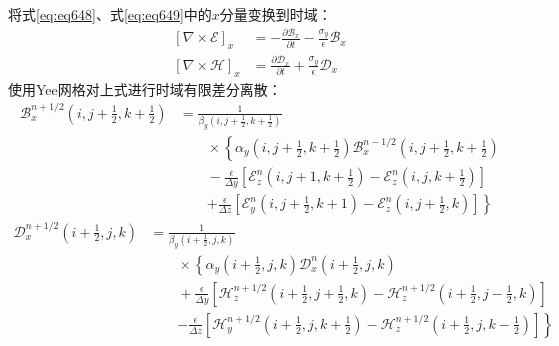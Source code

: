 \documentclass{article}
\numberwithin{equation}{section}
\renewcommand{\vec}[1]{\boldsymbol{#1}}
\begin{document}
将式\ref{eq:eq648}、式\ref{eq:eq649}中的$x$分量变换到时域：
\begin{align}
    \label{eq:eq652}
    \left[\nabla\times\vec{\mathcal{E}}\right]_x&=-\frac{\partial \mathcal{B}_x}{\partial t}-\frac{\sigma_y}{\epsilon}\mathcal{B}_x \\
    \label{eq:eq653}
    \left[\nabla\times\vec{\mathcal{H}}\right]_x&=\frac{\partial \mathcal{D}_x}{\partial t}+\frac{\sigma_y}{\epsilon}\mathcal{D}_x
\end{align}
使用Yee网格对上式进行时域有限差分离散：
\begin{align}
    \label{eq:eq654}
    \mathcal{B}^{n+1/2}_x\left(i,j+\frac{1}{2},k+\frac{1}{2}\right)&=\frac{1}{\beta_y\left(i,j+\frac{1}{2},k+\frac{1}{2}\right)} \nonumber \\
                                                                   &\qquad\times\left\{\alpha_y\left(i,j+\frac{1}{2},k+\frac{1}{2}\right)\mathcal{B}^{n-1/2}_x\left(i,j+\frac{1}{2},k+\frac{1}{2}\right)\right. \nonumber \\
                                                                   &\qquad-\frac{\epsilon}{\Delta y}\left[\mathcal{E}^n_z\left(i,j+1,k+\frac{1}{2}\right)-\mathcal{E}^n_z\left(i,j,k+\frac{1}{2}\right)\right] \nonumber \\
                                                                   &\qquad\left.+\frac{\epsilon}{\Delta z}\left[\mathcal{E}^n_y\left(i,j+\frac{1}{2},k+1\right)-\mathcal{E}^n_z\left(i,j+\frac{1}{2},k\right)\right]\right\}
\end{align}
\begin{align}
    \label{eq:eq655}
    \mathcal{D}^{n+1/2}_x\left(i+\frac{1}{2},j,k\right)&=\frac{1}{\beta_y\left(i+\frac{1}{2},j,k\right)} \nonumber \\
                                                       &\qquad\times\left\{\alpha_y\left(i+\frac{1}{2},j,k\right)\mathcal{D}^{n}_x\left(i+\frac{1}{2},j,k\right)\right. \nonumber \\
                                                       &\qquad+\frac{\epsilon}{\Delta y}\left[\mathcal{H}^{n+1/2}_z\left(i+\frac{1}{2},j+\frac{1}{2},k\right)-\mathcal{H}^{n+1/2}_z\left(i+\frac{1}{2},j-\frac{1}{2},k\right)\right] \nonumber \\
                                                       &\qquad\left.-\frac{\epsilon}{\Delta z}\left[\mathcal{H}^{n+1/2}_y\left(i+\frac{1}{2},j,k+\frac{1}{2}\right)-\mathcal{H}^{n+1/2}_z\left(i+\frac{1}{2},j,k-\frac{1}{2}\right)\right]\right\}
\end{align}
\end{document}
